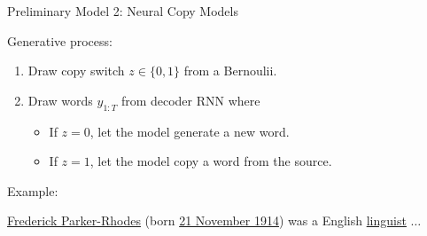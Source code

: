 



\begin{frame}{Preliminary Model 2: Neural Copy Models}

Generative process:
\begin{enumerate}
\item Draw copy switch $z \in \{0, 1\}$ from a Bernoulii.
\item Draw words $y_{1:T}$ from decoder RNN where
\begin{itemize}
\item If $z = 0$, let the model generate a new word.
  \air 
\item If $z = 1$, let the model copy a word from the source.
\end{itemize}

\end{enumerate}

\air
\air

Example:
\begin{center}
\underline{Frederick Parker-Rhodes} (born \underline{21 November
1914}) was a English \underline{linguist} $\ldots$ 


\end{center}
\end{frame}


